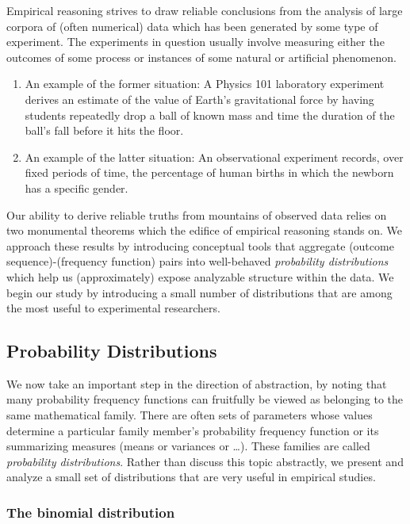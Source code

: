 Empirical reasoning strives to draw reliable conclusions from the analysis of large corpora of (often numerical) data which has been generated by some type of experiment.  The experiments in question usually involve measuring either the outcomes of some process or instances of some natural or artificial phenomenon.
\begin{enumerate}
\item
An example of the former situation:  A Physics 101 laboratory experiment derives an estimate of the value of Earth's gravitational force by having students repeatedly drop a ball of known mass and time the duration of the ball's fall before it hits the floor.

\medskip\item
An example of the latter situation:  An observational experiment records, over fixed periods of time, the percentage of human births in which the newborn has a specific gender.
\end{enumerate}

Our ability to derive reliable truths from mountains of observed data relies on two monumental theorems which the edifice of empirical reasoning stands on.  We approach these results by introducing conceptual tools that aggregate (outcome sequence)-(frequency function) pairs into well-behaved {\it probability distributions} which help us (approximately) expose analyzable structure within the data.  We begin our study by introducing a small number of distributions that are among the most useful to experimental researchers.

\subsection{Probability Distributions}
\label{sec:prob-distr}

We now take an important step in the direction of abstraction, by noting that many probability frequency functions can fruitfully be viewed as belonging to the same mathematical family.  There are often sets of parameters whose values determine a particular family member's probability frequency function or its summarizing measures (means or variances or \ldots). These families are called {\em probability distributions}.  Rather than discuss this topic abstractly, we present and analyze a small set of distributions that are very useful in empirical studies.

\subsubsection{The binomial distribution}
\label{sec:binomial-distribution}

